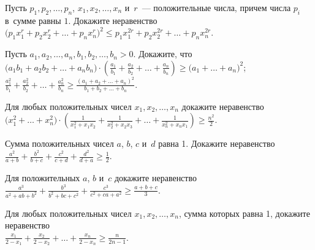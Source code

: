 \begin{problems}

\item
Пусть $p_{1}, p_{2}, \ldots, p_{n}$, $x_{1}, x_{2}, \ldots, x_{n}$ и~$r$~---
положительные числа, причем числа $p_{i}$ в~сумме равны $1$.
Докажите неравенство
\\[0.3ex]
\(
    \bigl( p_{1} x_{1}^r + p_{2} x_{2}^r + \ldots + p_{n} x_{n}^r \bigr)^2
\leq
    p_{1} x_{1}^{2r} + p_{2} x_{2}^{2r} + \ldots + p_{n} x_{n}^{2r}
\).

\item
Пусть $a_{1}, a_{2}, \ldots, a_{n}, b_{1}, b_{2}, \ldots, b_{n} > 0$.
Докажите, что
\\[0.5ex]
\subproblem
\( \displaystyle
    \bigl( a_{1} b_{1} + a_{2} b_{2} + \ldots + a_{n} b_{n} \bigr)
    \cdot
    \left(
        \frac{a_{1}}{b_{1}} + \frac{a_{2}}{b_{2}} +
        \ldots +
        \frac{a_{n}}{b_{n}}
    \right)
\geq
    \bigl( a_{1} + \ldots + a_{n} \bigr)^2
\);
\\[1.0ex]
\subproblem
\( \displaystyle
    \frac{a_{1}^2}{b_{1}} + \frac{a_{2}^2}{b_{2}} +
    \ldots + \frac{a_{n}^2}{b_{n}}
\geq
    \frac{(a_{1} + a_{2} + \ldots + a_{n})^2}{b_{1} + b_{2} + \ldots + b_{n}}
\).

\item
Для любых положительных чисел $x_{1}, x_{2}, \ldots, x_{n}$ докажите
неравенство
\\[0.5ex]
\( \displaystyle
    \bigl( x_{1}^2 + \ldots + x_{n}^2 \bigr)
    \cdot
    \left(
        \frac{1}{x_{1}^2 + x_{1} x_{2}} +
        \frac{1}{x_{2}^2 + x_{2} x_{3}} +
        \ldots +
        \frac{1}{x_{n}^2 + x_{n} x_{1}}
    \right)
\geq
    \frac{n^2}{2}
\).

\item
Сумма положительных чисел $a$, $b$, $c$ и~$d$ равна 1.
Докажите неравенство
\\[0.5ex]
\( \displaystyle
    \frac{a^2}{a + b} + \frac{b^2}{b + c} +
    \frac{c^2}{c + d} + \frac{d^2}{d + a}
\geq
    \frac{1}{2}
\).

\item
Для положительных $a$, $b$ и~$c$ докажите неравенство
\\[0.5ex]
\( \displaystyle
    \frac{a^3}{a^2 + a b + b^2} +
    \frac{b^3}{b^2 + b c + c^2} +
    \frac{c^3}{c^2 + c a + a^2}
\geq
    \frac{a+b+c}{3}
\).

\item
Для любых положительных чисел $x_{1}, x_{2}, \ldots, x_{n}$, сумма которых
равна 1, докажите неравенство
\\[0.5ex]
\( \displaystyle
    \frac{x_{1}}{2 - x_{1}} + \frac{x_{2}}{2 - x_{2}} +
    \ldots +
    \frac{x_{n}}{2 - x_{n}}
\geq
    \frac{n}{2 n - 1}
\).

\end{problems}

